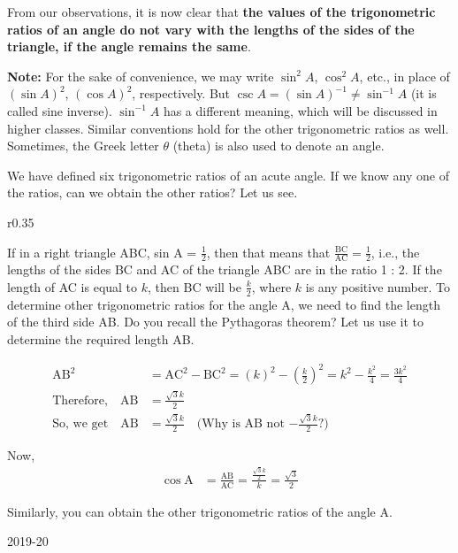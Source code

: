 \documentclass[11pt,a4paper]{article}
\begin{document}
\noindent From our observations, it is now clear that \textbf{the values of the trigonometric ratios of an angle do not vary with the lengths of the sides of the triangle, if the angle remains the same}.

\noindent\textbf{Note:} For the sake of convenience, we may write $\sin^2 A$, $\cos^2 A$, etc., in place of $(\sin A)^2$, $(\cos A)^2$, respectively. But $\csc A = (\sin A)^{-1} \ne \sin^{-1} A$ (it is called sine inverse). $\sin^{-1} A$ has a different meaning, which will be discussed in higher classes. Similar conventions hold for the other trigonometric ratios as well. Sometimes, the Greek letter $\theta$ (theta) is also used to denote an angle.


\noindent We have defined six trigonometric ratios of an acute angle. If we know any one of the ratios, can we obtain the other ratios? Let us see.

\begin{wrapfigure}{r}{0.35\textwidth}
\centering
\vspace{-15pt}
\vspace{-10pt}
\end{wrapfigure}
\noindent If in a right triangle ABC, sin A = $\frac{1}{2}$, then that means that $\frac{\mathrm{BC}}{\mathrm{AC}} = \frac{1}{2}$, i.e., the lengths of the sides BC and AC of the triangle ABC are in the ratio 1 : 2. If the length of AC is equal to $k$, then BC will be $\frac{k}{2}$, where $k$ is any positive number. To determine other trigonometric ratios for the angle A, we need to find the length of the third side AB. Do you recall the Pythagoras theorem? Let us use it to determine the required length AB.

\begin{align*}
\mathrm{AB}^2 &= \mathrm{AC}^2 - \mathrm{BC}^2 = (k)^2 - \left(\frac{k}{2}\right)^2 = k^2 - \frac{k^2}{4} = \frac{3k^2}{4} \\
\text{Therefore,} \quad \mathrm{AB} &= \frac{\sqrt{3}k}{2} \\
\text{So, we get} \quad \mathrm{AB} &= \frac{\sqrt{3}k}{2} \quad \text{(Why is AB not $-\frac{\sqrt{3}k}{2}$?)}
\end{align*}

\noindent Now,
\begin{align*}
\cos \mathrm{A} &= \frac{\mathrm{AB}}{\mathrm{AC}} = \frac{\frac{\sqrt{3}k}{2}}{k} = \frac{\sqrt{3}}{2}
\end{align*}

\noindent Similarly, you can obtain the other trigonometric ratios of the angle A.

\vfill
\begin{center}
2019-20
\end{center}
\pagestyle{empty}
\end{document}
